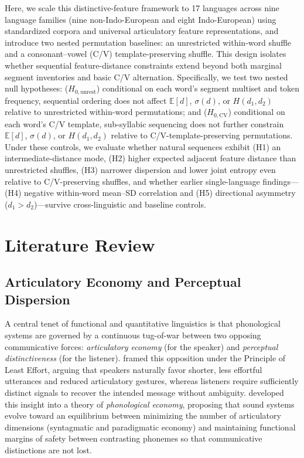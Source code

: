\documentclass{interact}
\begin{document}
Here, we scale this distinctive-feature framework to 17 languages across nine language families (nine non-Indo-European and eight Indo-European) using standardized corpora and universal articulatory feature representations, and introduce two nested permutation baselines: an unrestricted within-word shuffle and a consonant--vowel (C/V) template-preserving shuffle. This design isolates whether sequential feature-distance constraints extend beyond both marginal segment inventories and basic C/V alternation. Specifically, we test two nested null hypotheses: ($H_{0,\text{unrest}}$) conditional on each word's segment multiset and token frequency, sequential ordering does not affect $\mathbb{E}[d]$, $\sigma(d)$, or $H(d_1, d_2)$ relative to unrestricted within-word permutations; and ($H_{0,\text{CV}}$) conditional on each word's C/V template, sub-syllabic sequencing does not further constrain $\mathbb{E}[d]$, $\sigma(d)$, or $H(d_1, d_2)$ relative to C/V-template-preserving permutations. Under these controls, we evaluate whether natural sequences exhibit (H1) an intermediate-distance mode, (H2) higher expected adjacent feature distance than unrestricted shuffles, (H3) narrower dispersion and lower joint entropy even relative to C/V-preserving shuffles, and whether earlier single-language findings---(H4) negative within-word mean--SD correlation and (H5) directional asymmetry ($d_1 > d_2$)---survive cross-linguistic and baseline controls.

\section{Literature Review}
\subsection{Articulatory Economy and Perceptual Dispersion}
A central tenet of functional and quantitative linguistics is that phonological systems are governed by a continuous tug-of-war between two opposing communicative forces: \emph{articulatory economy} (for the speaker) and \emph{perceptual distinctiveness} (for the listener). \citet{zipf1949} framed this opposition under the Principle of Least Effort, arguing that speakers naturally favor shorter, less effortful utterances and reduced articulatory gestures, whereas listeners require sufficiently distinct signals to recover the intended message without ambiguity. \citet{martinet1955} developed this insight into a theory of \emph{phonological economy}, proposing that sound systems evolve toward an equilibrium between minimizing the number of articulatory dimensions (syntagmatic and paradigmatic economy) and maintaining functional margins of safety between contrasting phonemes so that communicative distinctions are not lost.
\end{document}
